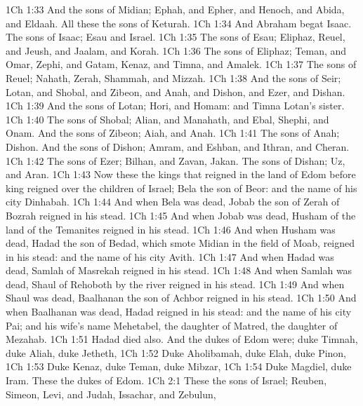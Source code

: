 \vs 1Ch 1:33 And the sons of Midian; Ephah, and Epher, and Henoch, and Abida, and Eldaah. All these  the sons of Keturah.
\vs 1Ch 1:34 And Abraham begat Isaac. The sons of Isaac; Esau and Israel.
\vs 1Ch 1:35 The sons of Esau; Eliphaz, Reuel, and Jeush, and Jaalam, and Korah.
\vs 1Ch 1:36 The sons of Eliphaz; Teman, and Omar, Zephi, and Gatam, Kenaz, and Timna, and Amalek.
\vs 1Ch 1:37 The sons of Reuel; Nahath, Zerah, Shammah, and Mizzah.
\vs 1Ch 1:38 And the sons of Seir; Lotan, and Shobal, and Zibeon, and Anah, and Dishon, and Ezer, and Dishan.
\vs 1Ch 1:39 And the sons of Lotan; Hori, and Homam: and Timna  Lotan's sister.
\vs 1Ch 1:40 The sons of Shobal; Alian, and Manahath, and Ebal, Shephi, and Onam. And the sons of Zibeon; Aiah, and Anah.
\vs 1Ch 1:41 The sons of Anah; Dishon. And the sons of Dishon; Amram, and Eshban, and Ithran, and Cheran.
\vs 1Ch 1:42 The sons of Ezer; Bilhan, and Zavan,  Jakan. The sons of Dishan; Uz, and Aran.
\vs 1Ch 1:43 Now these  the kings that reigned in the land of Edom before  king reigned over the children of Israel; Bela the son of Beor: and the name of his city  Dinhabah.
\vs 1Ch 1:44 And when Bela was dead, Jobab the son of Zerah of Bozrah reigned in his stead.
\vs 1Ch 1:45 And when Jobab was dead, Husham of the land of the Temanites reigned in his stead.
\vs 1Ch 1:46 And when Husham was dead, Hadad the son of Bedad, which smote Midian in the field of Moab, reigned in his stead: and the name of his city  Avith.
\vs 1Ch 1:47 And when Hadad was dead, Samlah of Masrekah reigned in his stead.
\vs 1Ch 1:48 And when Samlah was dead, Shaul of Rehoboth by the river reigned in his stead.
\vs 1Ch 1:49 And when Shaul was dead, Baalhanan the son of Achbor reigned in his stead.
\vs 1Ch 1:50 And when Baalhanan was dead, Hadad reigned in his stead: and the name of his city  Pai; and his wife's name  Mehetabel, the daughter of Matred, the daughter of Mezahab.
\vs 1Ch 1:51 Hadad died also. And the dukes of Edom were; duke Timnah, duke Aliah, duke Jetheth,
\vs 1Ch 1:52 Duke Aholibamah, duke Elah, duke Pinon,
\vs 1Ch 1:53 Duke Kenaz, duke Teman, duke Mibzar,
\vs 1Ch 1:54 Duke Magdiel, duke Iram. These  the dukes of Edom.
\vs 1Ch 2:1 These  the sons of Israel; Reuben, Simeon, Levi, and Judah, Issachar, and Zebulun,
